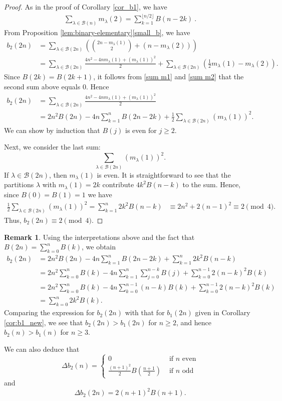 \documentclass[reqno]{amsart}
\theoremstyle{definition}
\newtheorem{remark}{Remark}
\begin{document}
\begin{proof} As  in the proof of Corollary \ref{cor_b1}, we have \begin{align}\sum_{\lambda\in \mathcal B(n)}m_\lambda(2)\label{sum m2} =\sum_{k=1}^{\lfloor n/2\rfloor} B(n-2k)\:.\end{align}
 From Proposition \ref{lem:binary-elementary}\ref{small_b}, we have \begin{align*}b_2(2n)  & = \sum_{\lambda\in\mathcal B(2n)}\left(\binom{2n -m_\lambda(1)}{2} + (n -m_\lambda(2)) \right)\\ & = \sum_{\lambda\in\mathcal B(2n)} \frac{4n^2-4nm_\lambda(1)+(m_\lambda(1))^2}{2}+ \sum_{\lambda\in\mathcal B(2n)} \left(\frac{1}{2}m_\lambda(1)-m_\lambda(2)\right).\end{align*} Since $B(2k)=B(2k+1)$, it follows from \eqref{sum m1} and \eqref{sum m2} that the second sum above equals $0$. Hence \begin{align*}b_2(2n)& =\sum_{\lambda\in\mathcal B(2n)} \frac{4n^2-4nm_\lambda(1)+(m_\lambda(1))^2}{2}\\ & = 2n^2 B(2n)-4n\sum_{k=1}^n B(2n-2k)+\frac{1}{2} \sum_{\lambda\in \mathcal B(2n)}(m_\lambda(1))^2. \end{align*} We can show by induction that  $B(j)$ is even for $j\geq 2$.
 


Next, we consider the last sum: $$\sum_{\lambda\in \mathcal B(2n)}(m_\lambda(1))^2.$$  If $\lambda \in \mathcal B(2n)$, then $m_\lambda(1)$ is even. 
It is straightforward to see that the partitions $\lambda$ with $m_\lambda(1)=2k$ contribute $4k^2 B(n-k)$ to the sum. Hence, since $B(0)=B(1)=1$ we have  \begin{align*}\frac{1}{2}\sum_{\lambda\in \mathcal B(2n)}(m_\lambda(1))^2 = \sum_{k=1}^{n}2k^2 B(n-k) & \equiv 2n^2+2(n-1)^2 \equiv 2\pmod 4.
     \end{align*}
Thus, $b_2(2n)\equiv 2 \pmod 4$.
\end{proof}

\begin{remark}Using the interpretations above and the fact that $B(2n)=\sum_{k=0}^n B(k)$, we obtain \begin{align*}b_2(2n)& =2n^2 B(2n)-4n\sum_{k=1}^n B(2n-2k)+\sum_{k=1}^{n}2k^2 B(n-k)\\ & = 2n^2\sum_{k=0}^n B(k)- 4n\sum_{k=1}^n\sum_{j=0}^{n-k}B(j)+\sum_{k=0}^{n-1}2(n-k)^2 B(k) \\& = 2n^2\sum_{k=0}^n B(k)- 4n\sum_{k=0}^{n-1}(n-k)B(k)+\sum_{k=0}^{n-1}2(n-k)^2 B(k)  \\ & =\sum_{k=0}^n 2k^2B(k).\end{align*}  Comparing the expression for $b_2(2n)$ with  that for $b_1(2n)$ given in Corollary \ref{cor:b1_new}, we see that $b_2(2n)>b_1(2n)$ for $n\geq 2$, and hence $b_2(n)>b_1(n)$ for $n\geq 3$. 

We can also deduce that  $$\Delta b_2(n)=\begin{cases} 0 & \text{ if $n$ even}\\ \frac{(n+1)^2}{2}B(\frac{n+1}{2})
   & \text{ if $n$ odd}
\end{cases}$$ and  $$\Delta b_2(2n)=2(n+1)^2B(n+1).$$\end{remark}
\end{document}
